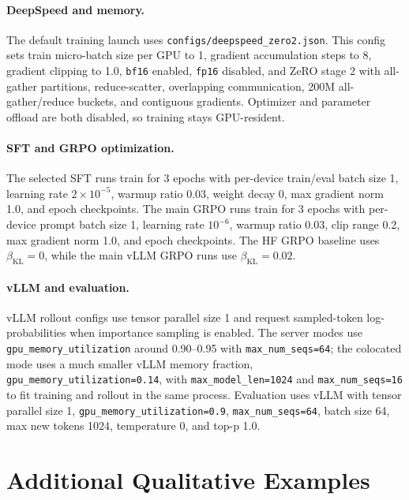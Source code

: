 \documentclass[11pt]{article}
\begin{document}
\paragraph{DeepSpeed and memory.}
The default training launch uses \texttt{configs/deepspeed\_zero2.json}. This config sets train micro-batch size per GPU to 1, gradient accumulation steps to 8, gradient clipping to 1.0, \texttt{bf16} enabled, \texttt{fp16} disabled, and ZeRO stage 2 with all-gather partitions, reduce-scatter, overlapping communication, 200M all-gather/reduce buckets, and contiguous gradients. Optimizer and parameter offload are both disabled, so training stays GPU-resident.

\paragraph{SFT and GRPO optimization.}
The selected SFT runs train for 3 epochs with per-device train/eval batch size 1, learning rate \(2\times 10^{-5}\), warmup ratio 0.03, weight decay 0, max gradient norm 1.0, and epoch checkpoints. The main GRPO runs train for 3 epochs with per-device prompt batch size 1, learning rate \(10^{-6}\), warmup ratio 0.03, clip range 0.2, max gradient norm 1.0, and epoch checkpoints. The HF GRPO baseline uses \(\beta_{\mathrm{KL}}=0\), while the main vLLM GRPO runs use \(\beta_{\mathrm{KL}}=0.02\).

\paragraph{vLLM and evaluation.}
vLLM rollout configs use tensor parallel size 1 and request sampled-token log-probabilities when importance sampling is enabled. The server modes use \texttt{gpu\_memory\_utilization} around 0.90--0.95 with \texttt{max\_num\_seqs=64}; the colocated mode uses a much smaller vLLM memory fraction, \texttt{gpu\_memory\_utilization=0.14}, with \texttt{max\_model\_len=1024} and \texttt{max\_num\_seqs=16} to fit training and rollout in the same process. Evaluation uses vLLM with tensor parallel size 1, \texttt{gpu\_memory\_utilization=0.9}, \texttt{max\_num\_seqs=64}, batch size 64, max new tokens 1024, temperature 0, and top-p 1.0.

\section{Additional Qualitative Examples}
\label{app:qualitative}
\end{document}

